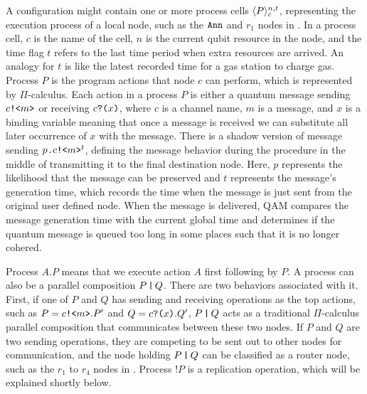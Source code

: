 A configuration might contain one or more process cells $\langle P \rangle^{n,t}_{c}$, representing the execution process of a local node,
such as the $\texttt{Ann}$ and $r_1$ nodes in .
In a process cell, $c$ is the name of the cell, $n$ is the current qubit resource in the node,
and the time flag $t$ refers to the last time period when extra resources are arrived.
An analogy for $t$ is like the latest recorded time for a gas station to charge gas.
Process $P$ is the program actions that node $c$ can perform, which is represented by $\Pi$-calculus.
Each action in a process $P$ is either a quantum message sending $c\texttt{!<}m\texttt{>}$ or receiving $c\texttt{?(}x\texttt{)}$,
where $c$ is a channel name, $m$ is a message, and $x$ is a binding variable 
meaning that once a message is received we can substitute all later occurrence of $x$ with the message.
There is a shadow version of message sending $p\texttt{.}c\texttt{!<}m\texttt{>}^t$,
defining the message behavior during the procedure in the middle of transmitting it to the final destination node.
Here, $p$ represents the likelihood that the message can be preserved and $t$ represents the message's generation time,
which records the time when the message is just sent from the original user defined node.
When the message is delivered, QAM compares the message generation time with the current global time
and determines if the quantum message is queued too long in some places such that it is no longer cohered.

Process $A.P$ means that we execute action $A$ first following by $P$.
A process can also be a parallel composition $P\,\texttt{|}\,Q$. There are two behaviors associated with it.
First, if one of $P$ and $Q$ has sending and receiving operations as the top actions, 
such as $P=c\texttt{!<}m\texttt{>}.P'$ and $Q=c\texttt{?(}x\texttt{)}.Q'$, $P\,\texttt{|}\,Q$ acts as a traditional $\Pi$-calculus parallel composition that communicates between these two nodes. If $P$ and $Q$ are two sending operations, they are competing to be sent out to other nodes for communication, and the node holding $P\,\texttt{|}\,Q$ can be classified as a router node, such as the $r_1$ to $r_4$ nodes in .
Process $!P$ is a replication operation, which will be explained shortly below.

